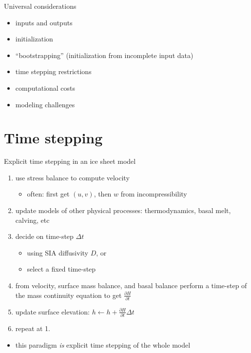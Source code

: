 \documentclass[hide notes,intlimits]{beamer}
\newcommand{\diff}[2]{\frac{\partial #1}{\partial #2}}
\begin{document}

\begin{frame}{Universal considerations}
  \begin{itemize}
  \item inputs and outputs
  \item initialization
  \item ``bootstrapping'' (initialization from incomplete input data)
  \item time stepping restrictions
  \item computational costs
  \item modeling challenges
  \end{itemize}
\end{frame}

\section{Time stepping}
\label{sec:time-stepping}

\begin{frame}{Explicit time stepping in an ice sheet model}

  \begin{enumerate}
  \item use stress balance to compute velocity
    \begin{itemize}
    \item often: first get $(u,v)$, then $w$ from incompressibility
    \end{itemize}
  \item update models of other physical processes: thermodynamics, basal melt, calving, etc
  \item decide on time-step $\Delta t$
    \begin{itemize}
    \item using SIA diffusivity $D$, or
    \item select a fixed time-step
    \end{itemize}
  \item from velocity, surface mass balance, and basal balance perform
    a time-step of the mass continuity equation to get $\diff{H}{t}$
  \item update surface elevation: $h \gets h + \diff{H}{t} \Delta t$
  \item repeat at 1.
  \end{enumerate}

  \bigskip
  \begin{itemize}
  \item this paradigm \emph{is} explicit time stepping of the whole model
  \end{itemize}
\end{frame}
\end{document}
